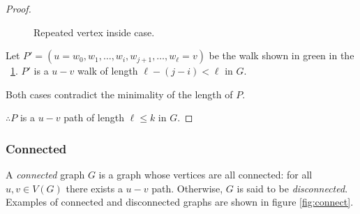 \begin{proof}
\begin{description}
    \begin{figure}[H]
      \centering
      \caption{Repeated vertex inside case.}
      \label{fig:rmiddle}
    \end{figure}

  Let \(P'=(u=w_0,w_1,\ldots,w_i,w_{j+1},\ldots,w_{\ell}=v)\) be the walk shown in green in the
  \figurename~\ref{fig:rmiddle}.  \(P'\) is a \(u-v\) walk of length \(\ell-(j-i)<\ell\) in \(G\).
  \end{description}

  Both cases contradict the minimality of the length of \(P\).

  \(\therefore P\) is a \(u-v\) path of length \(\ell\le k\) in \(G\).
\end{proof}

\subsubsection{Connected}\label{sec:sub:sub:connected}

A \emph{connected} graph \(G\) is a graph whose vertices are all connected: for all \(u,v\in V(G)\) there exists a
\(u-v\) path.  Otherwise, \(G\) is said to be \emph{disconnected}.  Examples of connected and disconnected graphs
are shown in figure \ref{fig:connect}.

